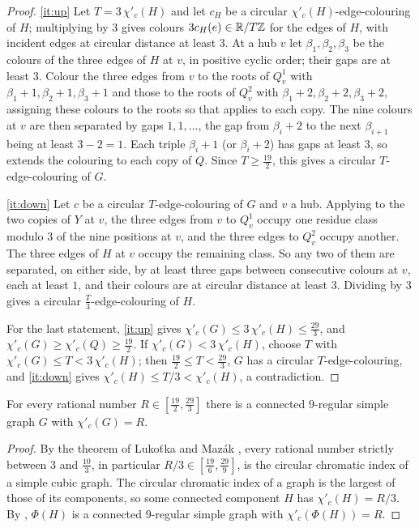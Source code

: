 \documentclass[11pt,colorlinks]{charlie}
\newcommand{\cind}{\chi'_c}
\begin{document}
\begin{proof}
\ref{it:up} Let $T=3\,\cind(H)$ and let $c_H$ be a circular $\cind(H)$-edge-colouring of $H$; multiplying by $3$ gives colours $3c_H(e)\in\mathbb{R}/T\mathbb{Z}$ for the edges of $H$, with incident edges at circular distance at least $3$. At a hub $v$ let $\beta_1,\beta_2,\beta_3$ be the colours of the three edges of $H$ at $v$, in positive cyclic order; their gaps are at least $3$. Colour the three edges from $v$ to the roots of $Q_v^1$ with $\beta_1+1,\beta_2+1,\beta_3+1$ and those to the roots of $Q_v^2$ with $\beta_1+2,\beta_2+2,\beta_3+2$, assigning these colours to the roots so that  applies to each copy. The nine colours at $v$ are then separated by gaps $1,1,\dots$, the gap from $\beta_i+2$ to the next $\beta_{i+1}$ being at least $3-2=1$. Each triple $\beta_i+1$ (or $\beta_i+2$) has gaps at least $3$, so  extends the colouring to each copy of $Q$. Since $T\ge\frac{19}{2}$, this gives a circular $T$-edge-colouring of $G$.

\ref{it:down} Let $c$ be a circular $T$-edge-colouring of $G$ and $v$ a hub. Applying  to the two copies of $Y$ at $v$, the three edges from $v$ to $Q_v^1$ occupy one residue class modulo $3$ of the nine positions at $v$, and the three edges to $Q_v^2$ occupy another. The three edges of $H$ at $v$ occupy the remaining class. So any two of them are separated, on either side, by at least three gaps between consecutive colours at $v$, each at least $1$, and their colours are at circular distance at least $3$. Dividing by $3$ gives a circular $\frac T3$-edge-colouring of $H$.

For the last statement, \ref{it:up} gives $\cind(G)\le3\,\cind(H)\le\frac{29}{3}$, and $\cind(G)\ge\cind(Q)\ge\frac{19}{2}$. If $\cind(G)<3\,\cind(H)$, choose $T$ with $\cind(G)\le T<3\,\cind(H)$; then $\frac{19}{2}\le T<\frac{29}{3}$, $G$ has a circular $T$-edge-colouring, and \ref{it:down} gives $\cind(H)\le T/3<\cind(H)$, a contradiction.
\end{proof}

\begin{corollary}\label{cor:interval}
For every rational number $R\in[\frac{19}{2},\frac{29}{3}]$ there is a connected $9$-regular simple graph $G$ with $\cind(G)=R$.
\end{corollary}

\begin{proof}
By the theorem of Lukoťka and Mazák \cite{LM}, every rational number strictly between $3$ and $\frac{10}{3}$, in particular $R/3\in[\frac{19}{6},\frac{29}{9}]$, is the circular chromatic index of a simple cubic graph. The circular chromatic index of a graph is the largest of those of its components, so some connected component $H$ has $\cind(H)=R/3$. By , $\Phi(H)$ is a connected $9$-regular simple graph with $\cind(\Phi(H))=R$.
\end{proof}
\end{document}
